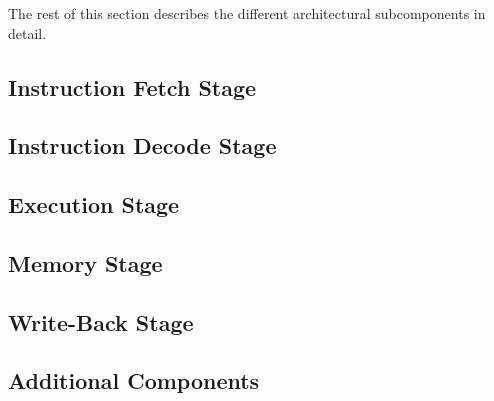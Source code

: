 The rest of this section describes the different architectural subcomponents in detail.

\subsection{Instruction Fetch Stage}
    

\subsection{Instruction Decode Stage}
    

\subsection{Execution Stage}
    

\subsection{Memory Stage}
    

\subsection{Write-Back Stage}
    

\subsection{Additional Components}
    
